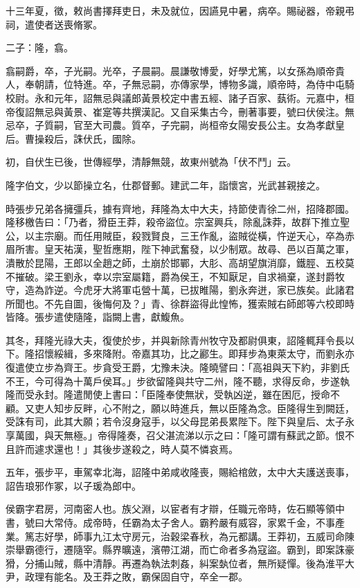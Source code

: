 \begin{pinyinscope}
十三年夏，徵，敕尚書擇拜吏日，未及就位，因讌見中暑，病卒。賜祕器，帝親弔祠，遣使者送喪脩冢。

二子：隆，翕。

翕嗣爵，卒，子光嗣。光卒，子晨嗣。晨謙敬博愛，好學尤篤，以女孫為順帝貴人，奉朝請，位特進。卒，子無忌嗣，亦傳家學，博物多識，順帝時，為侍中屯騎校尉。永和元年，詔無忌與議郎黃景校定中書五經、諸子百家、蓺術。元嘉中，桓帝復詔無忌與黃景、崔寔等共撰漢記。又自采集古今，刪著事要，號曰伏侯注。無忌卒，子質嗣，官至大司農。質卒，子完嗣，尚桓帝女陽安長公主。女為孝獻皇后。曹操殺后，誅伏氏，國除。

初，自伏生已後，世傳經學，清靜無競，故東州號為「伏不鬥」云。

隆字伯文，少以節操立名，仕郡督郵。建武二年，詣懷宮，光武甚親接之。

時張步兄弟各擁彊兵，據有齊地，拜隆為太中大夫，持節使青徐二州，招降郡國。隆移檄告曰：「乃者，猾臣王莽，殺帝盜位。宗室興兵，除亂誅莽，故群下推立聖公，以主宗廟。而任用賊臣，殺戮賢良，三王作亂，盜賊從橫，忤逆天心，卒為赤眉所害。皇天祐漢，聖哲應期，陛下神武奮發，以少制眾。故尋、邑以百萬之軍，潰散於昆陽，王郎以全趙之師，土崩於邯鄲，大肜、高胡望旗消靡，鐵脛、五校莫不摧破。梁王劉永，幸以宗室屬籍，爵為侯王，不知厭足，自求禍棄，遂封爵牧守，造為詐逆。今虎牙大將軍屯營十萬，已拔睢陽，劉永奔迸，家已族矣。此諸君所聞也。不先自圖，後悔何及？」青、徐群盜得此惶怖，獲索賊右師郎等六校即時皆降。張步遣使隨隆，詣闕上書，獻鰒魚。

其冬，拜隆光祿大夫，復使於步，并與新除青州牧守及都尉俱東，詔隆輒拜令長以下。隆招懷綏緝，多來降附。帝嘉其功，比之酈生。即拜步為東萊太守，而劉永亦復遣使立步為齊王。步貪受王爵，冘豫未決。隆曉譬曰：「高祖與天下約，非劉氏不王，今可得為十萬戶侯耳。」步欲留隆與共守二州，隆不聽，求得反命，步遂執隆而受永封。隆遣閒使上書曰：「臣隆奉使無狀，受執凶逆，雖在困厄，授命不顧。又吏人知步反畔，心不附之，願以時進兵，無以臣隆為念。臣隆得生到闕廷，受誅有司，此其大願；若令沒身寇手，以父母昆弟長累陛下。陛下與皇后、太子永享萬國，與天無極。」帝得隆奏，召父湛流涕以示之曰：「隆可謂有蘇武之節。恨不且許而遽求還也！」其後步遂殺之，時人莫不憐哀焉。

五年，張步平，車駕幸北海，詔隆中弟咸收隆喪，賜給棺斂，太中大夫護送喪事，詔告琅邪作冢，以子瑗為郎中。

侯霸字君房，河南密人也。族父淵，以宦者有才辯，任職元帝時，佐石顯等領中書，號曰大常侍。成帝時，任霸為太子舍人。霸矜嚴有威容，家累千金，不事產業。篤志好學，師事九江太守房元，治穀梁春秋，為元都講。王莽初，五威司命陳崇舉霸德行，遷隨宰。縣界曠遠，濱帶江湖，而亡命者多為寇盜。霸到，即案誅豪猾，分捕山賊，縣中清靜。再遷為執法刺姦，糾案埶位者，無所疑憚。後為淮平大尹，政理有能名。及王莽之敗，霸保固自守，卒全一郡。


\end{pinyinscope}
